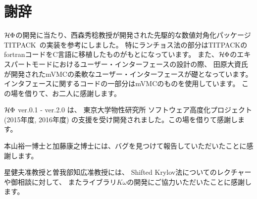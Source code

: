 \chapter{謝辞}
\label{Ch:ack}
$\mathcal{H} \Phi$の開発に当たり、西森秀稔教授が開発された先駆的な数値対角化パッケージTITPACK~\cite{titpack}の実装を参考にしました。
特にランチョス法の部分はTITPACKのfortranコードをC言語に移植したものがもとになっています。
また、$\mathcal{H} \Phi$のエキスパートモードにおけるユーザー・インターフェースの設計の際、
田原大資氏が開発されたmVMCの柔軟なユーザー・インターフェースが礎となっています。
インタフェースに関するコードの一部分はmVMCのものを使用しています。
この場を借りて、お二人に感謝します。

$\mathcal{H} \Phi$ ver.0.1 - ver.2.0 は、
東京大学物性研究所 ソフトウェア高度化プロジェクト(2015年度, 2016年度)
の支援を受け開発されました。この場を借りて感謝します。

本山裕一博士と加藤康之博士には、バグを見つけて報告していただいたことに感謝します。

星健夫准教授と曽我部知広准教授には、
Shifted Krylov法についてのレクチャーや御相談に対して、
またライブラリ$K\omega$の開発にご協力いただいたことに感謝します。
